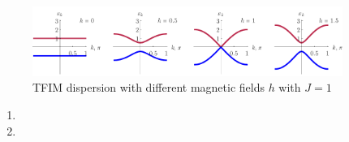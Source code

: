 
\begin{figure}[h]
    \centering
    \includegraphics[width=0.9\textwidth]{imgs/3gap.pdf}
    \caption{TFIM dispersion with different magnetic fields $h$ with $J=1$}
    \label{fig:gap}
\end{figure}


\begin{enumerate}[label=(\alph*)]
    \item 
    \item 
\end{enumerate}
